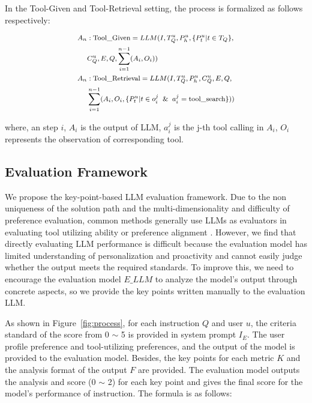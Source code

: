\documentclass[11pt]{article}
\begin{document}
In the Tool-Given and Tool-Retrieval setting, the process is formalized as follows respectively:



\begin{equation}
\footnotesize
\begin{aligned}
    A_n&:\text{Tool\_Given} = LLM(I, T_Q^u, P_h^u, \{P_t^u|t \in T_Q\}, \\ &C_Q^u, E, Q, \sum_{i=1}^{n-1}(A_i, O_i))\\
    A_n&:\text{Tool\_Retrieval} = LLM(I, T_Q^u, P_h^u, C_Q^u, E, Q, \\ &\sum_{i=1}^{n-1}(A_i, O_i, \{P_t^u|t \in o_i^j \And a_i^j=\text{tool\_search}\}))
\end{aligned}
\end{equation}


where, an step $i$, $A_i$ is the output of LLM, $a_i^j$ is the j-th tool calling in $A_i$, $O_i$ represents the observation of corresponding tool.







\subsection{Evaluation Framework}
\label{sec:evaluation_framework}
We propose the key-point-based LLM evaluation framework. Due to the non uniqueness of the solution path and the multi-dimensionality and difficulty of preference evaluation, common methods generally use LLMs as evaluators in evaluating tool utilizing ability \cite{DBLP:conf/iclr/QinLYZYLLCTQZHT24} or preference alignment \cite{zhao2025do}. However, we find that directly evaluating LLM performance is difficult because the evaluation model has limited understanding of personalization and proactivity and cannot easily judge whether the output meets the required standards. To improve this, we need to encourage the evaluation model $E\_LLM$ to analyze the model's output through concrete aspects, so we provide the key points written manually to the evaluation LLM. 






As shown in Figure~\ref{fig:process}, for each instruction $Q$ and user $u$, the criteria standard of the score from 0 $\sim$ 5 is provided in system prompt $I_E$. The user profile preference and tool-utilizing preferences, and the output of the model is provided to the evaluation model. Besides, the key points for each metric $K$ and the analysis format of the output $F$ are provided. The evaluation model outputs the analysis and score (0 $\sim$ 2) for each key point and gives the final score for the model's performance of instruction. The formula is as follows:
\end{document}
